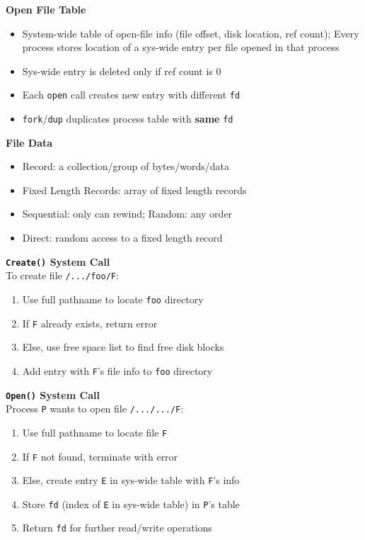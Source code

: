 \documentclass[a4paper, 12pt]{article}
\begin{document}
\begin{multicols*}{4}
\begin{itemize}
\begin{itemize}
	\end{itemize}
\end{itemize}
\textbf{Open File Table}
\begin{itemize}
	\item System-wide table of open-file info (file offset, disk location, ref count); Every process stores location of a sys-wide entry per file opened in that process
	\item Sys-wide entry is deleted only if ref count is 0
	\item Each \texttt{open} call creates new entry with different \texttt{fd}
	\item \texttt{fork}/\texttt{dup} duplicates process table with \textbf{same} \texttt{fd}
\end{itemize}
\textbf{File Data}
\begin{itemize}
	\item Record: a collection/group of bytes/words/data
	\item Fixed Length Records: array of fixed length records
	\item Sequential: only can rewind; Random: any order
	\item Direct: random access to a fixed length record
\end{itemize}
\textbf{\texttt{Create()} System Call} \\
To create file \texttt{/.../foo/F}:
\begin{enumerate}
	\item Use full pathname to locate \texttt{foo} directory
	\item If \texttt{F} already exists, return error
	\item Else, use free space list to find free disk blocks
	\item Add entry with \texttt{F}'s file info to \texttt{foo} directory 
\end{enumerate}
\textbf{\texttt{Open()} System Call} \\
Process \texttt{P} wants to open file \texttt{/.../.../F}:
\begin{enumerate}
	\item Use full pathname to locate file \texttt{F}
	\item If \texttt{F} not found, terminate with error
	\item Else, create entry \texttt{E} in sys-wide table with \texttt{F}'s info
	\item Store \texttt{fd} (index of \texttt{E} in sys-wide table) in \texttt{P}'s table
	\item Return \texttt{fd} for further read/write operations

\end{enumerate}
\end{multicols*}
\end{document}
